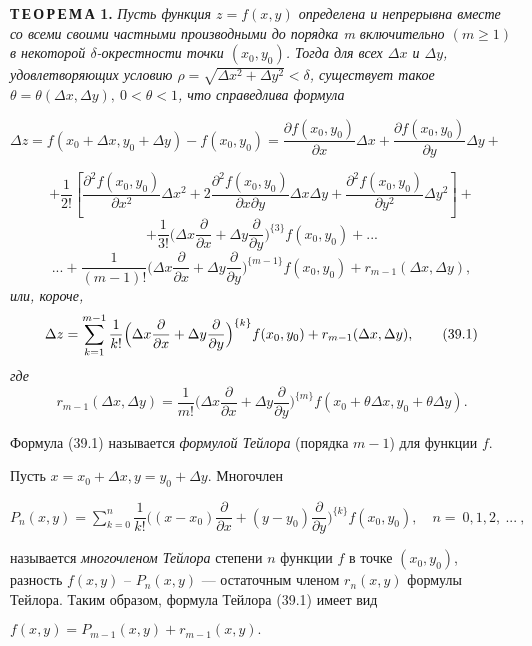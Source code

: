 \documentclass[a4paper]{article}
\begin{document}
\noindent\textsf{\textbf{Т\,Е\,О\,Р\,Е\,М\,А 1.}}
\textit{Пусть функция $z = f(x, y)$ определена и непрерывна вместе со всеми своими частными производными до порядка m включительно $(m \geqslant 1)$ в некоторой $\delta$-окрестности точки $(x_0, y_0)$. Тогда для всех $\Delta x$ и $\Delta y$, удовлетворяющих условию $\rho = \sqrt{\Delta x^2 + \Delta y^2}< \delta$, существует такое $\theta = \theta(\Delta x, \Delta y),\ 0 < \theta < 1$, что справедлива формула}
\begin{flushleft}
$\Delta z = f(x_0 + \Delta x, y_0 + \Delta y) - f(x_0, y_0) = \dfrac{\partial f(x_0, y_0)}{\partial x} \Delta x + \dfrac{\partial f(x_0, y_0)}{\partial y} \Delta y +$
\end{flushleft}
\[+ \dfrac{1}{2!}\left[\dfrac{\partial^2f(x_0, y_0)}{\partial x^2}\Delta x^2 + 2\dfrac{\partial^2f(x_0,y_0)}{\partial x\partial y}\Delta x\Delta y + \dfrac{\partial^2f(x_0,y_0)}{\partial y^2}\Delta y^2\right] +\]
\[+ \dfrac{1}{3!}\Big( \Delta x \dfrac{\partial}{\partial x} + \Delta y \dfrac{\partial}{\partial y}\Big) ^{\{3\}}f(x_0,y_0) + ...\]
\[... + \dfrac{1}{(m-1)!}\Big(\Delta x \dfrac{\partial}{\partial x} + \Delta y \dfrac{\partial}{\partial y}\Big)^{\{m-1\}}f(x_0, y_0) + r_{m-1}(\Delta x, \Delta y),\]
\noindent\textit{или, короче,}
\[\Delta z = \sum\limits\limits_{k = 1}^{m-1}\frac{1}{k!}\Big(\Delta x \frac{\partial}{\partial x} + \Delta y \frac{\partial}{\partial y}\Big)^{\{k\}}f(x_0,y_0) + r_{m-1}(\Delta x, \Delta y), \tag{39.1}\]
\textit{где}
\[r_{m-1}(\Delta x, \Delta y) = \frac{1}{m!}\Big(\Delta x \frac{\partial}{\partial x} + \Delta y \frac{\partial}{\partial y}\Big)^{\{m\}}f(x_0 + \theta \Delta x, y_0 + \theta\Delta y). \tag{39.2}\]

Формула (39.1) называется
\textit{формулой Тейлора}
(порядка $m - 1$) для функции $f$.

Пусть $x = x_0 + \Delta x, y = y_0 + \Delta y$. Многочлен
\begin{flushleft}
    $P_n(x, y) = \sum\limits_{k = 0}^n \dfrac{1}{k!}\Big((x-x_0)\dfrac{\partial}{\partial x} + (y-y_0)\dfrac{\partial}{\partial y}\Big)^{\{k\}}f(x_0, y_0),\quad n =\ 0, 1, 2,\ ...\ ,$
\end{flushleft}
называется \textit{многочленом Тейлора} степени $n$ функции $f$ в точке $(x_0, y_0)$, разность $f(x,y)$ -- $P_n(x, y)$ --- остаточным членом $r_n(x,y)$ формулы Тейлора. Таким образом, формула Тейлора (39.1) имеет вид
\begin{center}
    $f(x,y) = P_{m-1}(x,y) + r_{m-1}(x, y).$
\end{center}
\end{document}
